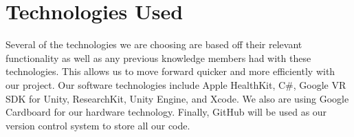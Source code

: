\chapter{Technologies Used} \label{tech-used} %

Several of the technologies we are choosing are based off their relevant functionality as well as any previous knowledge members had with these technologies. This allows us to move forward quicker and more efficiently with our project. Our software technologies include Apple HealthKit, C\#, Google VR SDK for Unity, ResearchKit, Unity Engine, and Xcode. We also are using Google Cardboard for our hardware technology. Finally, GitHub will be used as our version control system to store all our code.

\begin{table}[h!]
\centering
\caption{Technologies Used}
\label{table:tech-used}
\vspace{5mm}
\end{table}

